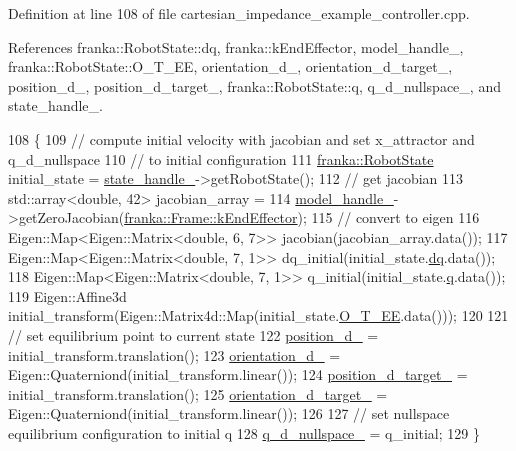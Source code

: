 Definition at line 108 of file cartesian\+\_\+impedance\+\_\+example\+\_\+controller.\+cpp.



References franka\+::\+Robot\+State\+::dq, franka\+::k\+End\+Effector, model\+\_\+handle\+\_\+, franka\+::\+Robot\+State\+::\+O\+\_\+\+T\+\_\+\+EE, orientation\+\_\+d\+\_\+, orientation\+\_\+d\+\_\+target\+\_\+, position\+\_\+d\+\_\+, position\+\_\+d\+\_\+target\+\_\+, franka\+::\+Robot\+State\+::q, q\+\_\+d\+\_\+nullspace\+\_\+, and state\+\_\+handle\+\_\+.


\begin{DoxyCode}
108                                                                    \{
109   \textcolor{comment}{// compute initial velocity with jacobian and set x\_attractor and q\_d\_nullspace}
110   \textcolor{comment}{// to initial configuration}
111   \hyperlink{structfranka_1_1RobotState}{franka::RobotState} initial\_state = \hyperlink{classfranka__example__controllers_1_1CartesianImpedanceExampleController_affdc57722887831ee0e3e02332eae345}{state\_handle\_}->getRobotState();
112   \textcolor{comment}{// get jacobian}
113   std::array<double, 42> jacobian\_array =
114       \hyperlink{classfranka__example__controllers_1_1CartesianImpedanceExampleController_a588de895d4aaef43c00bc11e6b789084}{model\_handle\_}->getZeroJacobian(\hyperlink{namespacefranka_a00b729ddce916481d3f0d10febec4f5ba3617dcc7555dbca3c3e86e7535914fdf}{franka::Frame::kEndEffector});
115   \textcolor{comment}{// convert to eigen}
116   Eigen::Map<Eigen::Matrix<double, 6, 7>> jacobian(jacobian\_array.data());
117   Eigen::Map<Eigen::Matrix<double, 7, 1>> dq\_initial(initial\_state.\hyperlink{structfranka_1_1RobotState_af372a0081d72bc7b4fe873f99c7b2d8c}{dq}.data());
118   Eigen::Map<Eigen::Matrix<double, 7, 1>> q\_initial(initial\_state.\hyperlink{structfranka_1_1RobotState_ade3335d1ac2f6c44741a916d565f7091}{q}.data());
119   Eigen::Affine3d initial\_transform(Eigen::Matrix4d::Map(initial\_state.\hyperlink{structfranka_1_1RobotState_a193781d47722b32925e0ea7ac415f442}{O\_T\_EE}.data()));
120 
121   \textcolor{comment}{// set equilibrium point to current state}
122   \hyperlink{classfranka__example__controllers_1_1CartesianImpedanceExampleController_a7b1ed13a31a9561ced03a8a9221a303f}{position\_d\_} = initial\_transform.translation();
123   \hyperlink{classfranka__example__controllers_1_1CartesianImpedanceExampleController_a8528ed0cf7de6439e65bb1d4c4017137}{orientation\_d\_} = Eigen::Quaterniond(initial\_transform.linear());
124   \hyperlink{classfranka__example__controllers_1_1CartesianImpedanceExampleController_a2d30d23bda9622c57d2e894cfd00cc37}{position\_d\_target\_} = initial\_transform.translation();
125   \hyperlink{classfranka__example__controllers_1_1CartesianImpedanceExampleController_ae2c7eed26db0a1b708b91148451bb13e}{orientation\_d\_target\_} = Eigen::Quaterniond(initial\_transform.linear());
126 
127   \textcolor{comment}{// set nullspace equilibrium configuration to initial q}
128   \hyperlink{classfranka__example__controllers_1_1CartesianImpedanceExampleController_a17864b23083e90764168ceb4ea843df8}{q\_d\_nullspace\_} = q\_initial;
129 \}
\end{DoxyCode}
